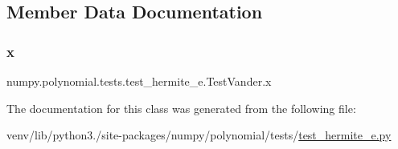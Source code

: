 \subsection{Member Data Documentation}
\mbox{\label{classnumpy_1_1polynomial_1_1tests_1_1test__hermite__e_1_1TestVander_ab7f8e49d7d178ce292949a5db658ef69}} 
\subsubsection{\texorpdfstring{x}{x}}
{\footnotesize\ttfamily numpy.\+polynomial.\+tests.\+test\+\_\+hermite\+\_\+e.\+Test\+Vander.\+x\hspace{0.3cm}{\ttfamily [static]}}



The documentation for this class was generated from the following file\+:\begin{DoxyCompactItemize}
\item 
venv/lib/python3./site-\/packages/numpy/polynomial/tests/\hyperlink{test__hermite__e_8py}{test\+\_\+hermite\+\_\+e.\+py}\end{DoxyCompactItemize}
